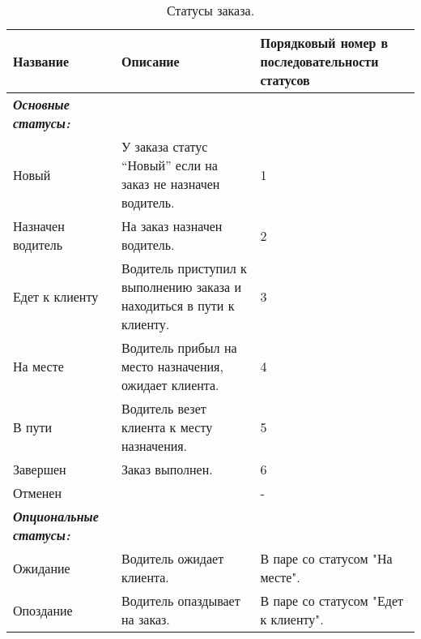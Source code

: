     	\begin{table}
			\begin{center}
			\caption {Статусы заказа.}
			\label{table_order_status}
			\setlength{\extrarowheight}{2mm}
			\begin{tabular}{|p{3cm}|p{9cm}|p{3cm}|}

			\hline     \textbf{Название} & \textbf{Описание} & \textbf{Порядковый номер в последовательности статусов}\\ [2mm]

			\hline \textit{\textbf{Основные статусы:}}  &  & \\ [2mm]

			\hline Новый  

				& У заказа статус “Новый” если на заказ не назначен водитель. 
				& 1 \\ [2mm]

			\hline Назначен водитель  
				& На заказ назначен водитель.  
				& 2 \\ [2mm]

			\hline Едет к клиенту 
				& Водитель приступил к выполнению заказа и находиться в пути к клиенту. 
				& 3 \\ [2mm]

			\hline На месте  
				& Водитель прибыл на место назначения, ожидает клиента. 
				& 4\\ [2mm]

			\hline В пути  
				& Водитель везет клиента к месту назначения. 
				& 5\\ [2mm]

			\hline Завершен  
				& Заказ выполнен. 
				& 6\\ [2mm]

			\hline Отменен  &  & - \\ [2mm]

			\hline \textit{\textbf{Опциональные статусы:}}  &  & \\ [2mm]

			\hline Ожидание  & Водитель ожидает клиента. & В паре со статусом "На месте".\\ [2mm]
			\hline Опоздание  & Водитель опаздывает на заказ. & В паре со статусом "Едет к клиенту".\\ [2mm]
			\hline
			\end{tabular}
			\end{center}
		\end{table}
